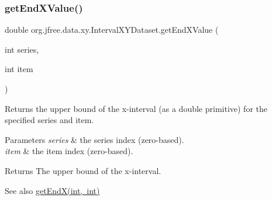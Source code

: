 \mbox{\label{interfaceorg_1_1jfree_1_1data_1_1xy_1_1_interval_x_y_dataset_ad976e66caa1fc4d72a599f2c26c55dcc}} 
\subsubsection{\texorpdfstring{get\+End\+X\+Value()}{getEndXValue()}}
{\footnotesize\ttfamily double org.\+jfree.\+data.\+xy.\+Interval\+X\+Y\+Dataset.\+get\+End\+X\+Value (\begin{DoxyParamCaption}\item[{int}]{series,  }\item[{int}]{item }\end{DoxyParamCaption})}

Returns the upper bound of the x-\/interval (as a double primitive) for the specified series and item.


\begin{DoxyParams}{Parameters}
{\em series} & the series index (zero-\/based). \\
\hline
{\em item} & the item index (zero-\/based).\\
\hline
\end{DoxyParams}
\begin{DoxyReturn}{Returns}
The upper bound of the x-\/interval.
\end{DoxyReturn}
\begin{DoxySeeAlso}{See also}
\mbox{\hyperlink{interfaceorg_1_1jfree_1_1data_1_1xy_1_1_interval_x_y_dataset_a93161a6d6c1db37cfac030239c62ab0a}{get\+End\+X(int, int)}} 
\end{DoxySeeAlso}


